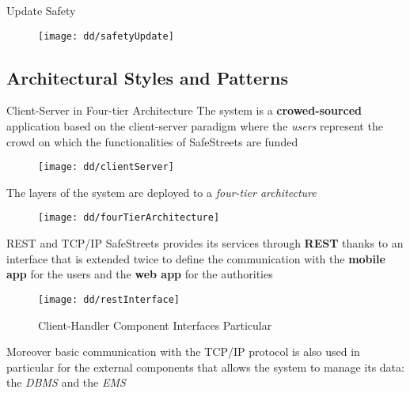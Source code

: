 		\begin{frame}{Update Safety}
			\begin{figure}[hbtp]
				\centering
				\texttt{[image: dd/safetyUpdate]}
			\end{figure}
		\end{frame}
	
	\subsection{Architectural Styles and Patterns}
		\begin{frame}{Client-Server in Four-tier Architecture}
			The system is a \textbf{crowed-sourced} application based on the client-server paradigm where the \emph{users} represent the crowd on which the functionalities of SafeStreets are funded
			
			\begin{figure}[h!]
				\centering
				\texttt{[image: dd/clientServer]}
			\end{figure}
		
			The layers of the system are deployed to a \emph{four-tier architecture}
			
			\begin{figure}[h]
				\centering
				\texttt{[image: dd/fourTierArchitecture]}
			\end{figure}
		\end{frame}
	
		\begin{frame}{REST and TCP/IP}
			SafeStreets provides its services through \textbf{REST} thanks to an interface that is extended twice to define the communication with the \textbf{mobile app} for the users and the \textbf{web app} for the authorities
			
			\begin{figure}
				\begin{minipage}{0.42\textwidth}
					\centering
					\texttt{[image: dd/restInterface]}
				\end{minipage}
				\begin{minipage}{0.3\textwidth}\tiny
					\color{polimiblue}Client-Handler Component Interfaces Particular
				\end{minipage}
			\end{figure}
			
			Moreover basic communication with the TCP/IP protocol is also used in particular for the external components that allows the system to manage its data: the \emph{DBMS} and the \emph{EMS}
		\end{frame}
		
